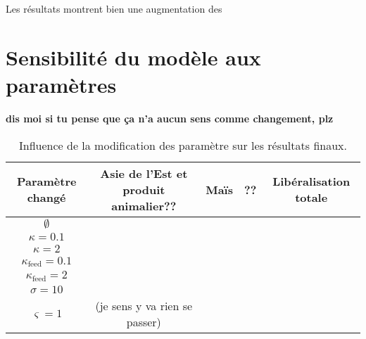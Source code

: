 Les résultats montrent bien une augmentation des


\section{Sensibilité du modèle aux paramètres}

\textbf{dis moi si tu pense que ça n'a aucun sens comme changement, plz}
\begin{table}[hbt!]
    \centering
    \caption{Influence de la modification des paramètre sur les résultats finaux.}
    \label{tab:sensibilite_param}
    \begin{tabular}{c|cccc}
        \hline
        Paramètre changé           & Asie de l'Est et produit animalier?? & Maïs & ?? & Libéralisation totale \\ \hline
        $\emptyset$                &                                      &      &    &                       \\
        $\kappa = 0.1$             &                                      &      &    &                       \\
        $\kappa = 2$               &                                      &      &    &                       \\
        $\kappa_\text{feed} = 0.1$ &                                      &      &    &                       \\
        $\kappa_\text{feed} = 2$   &                                      &      &    &                       \\
        $\sigma = 10$              &                                      &      &    &                       \\
        $\varsigma = 1$            & (je sens y va rien se passer)                                            \\
    \end{tabular}%
\end{table}

